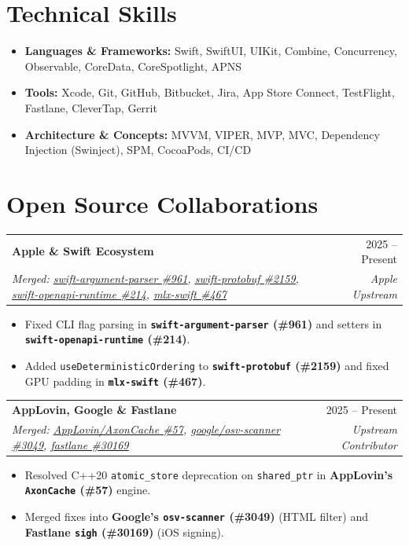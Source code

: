 \documentclass[a4paper,10pt]{article}
\makeatletter
\newcommand{\resumeSubheading}[4]{
  \vspace{4pt}
  \begin{tabular*}{\textwidth}{l@{\extracolsep{\fill}}r}
    \textbf{#1} & \small #2 \\
    \textit{\small #3} & \textit{\small #4} \\
  \end{tabular*}
  \vspace{-5pt}
}
\newcommand{\resumeItemListStart}{\begin{itemize}[leftmargin=0.16in, itemsep=1.8pt, topsep=2.5pt, parsep=0pt]\small}
\newcommand{\resumeItemListEnd}{\end{itemize}\vspace{-2pt}}
\makeatother
\begin{document}
\section{Technical Skills}
\resumeItemListStart
\item \textbf{Languages \& Frameworks:} Swift, SwiftUI, UIKit, Combine, Concurrency, Observable, CoreData, CoreSpotlight, APNS
\item \textbf{Tools:} Xcode, Git, GitHub, Bitbucket, Jira, App Store Connect, TestFlight, Fastlane, CleverTap, Gerrit
\item \textbf{Architecture \& Concepts:} MVVM, VIPER, MVP, MVC, Dependency Injection (Swinject), SPM, CocoaPods, CI/CD
\resumeItemListEnd

\section{Open Source Collaborations}

\resumeSubheading
{Apple \& Swift Ecosystem}{2025 -- Present}
{Merged: \href{https://github.com/apple/swift-argument-parser/pull/961}{\underline{swift-argument-parser \#961}}, \href{https://github.com/apple/swift-protobuf/pull/2159}{\underline{swift-protobuf \#2159}}, \href{https://github.com/apple/swift-openapi-runtime/pull/214}{\underline{swift-openapi-runtime \#214}}, \href{https://github.com/ml-explore/mlx-swift/pull/467}{\underline{mlx-swift \#467}}}{Apple Upstream}
\resumeItemListStart
\item Fixed CLI flag parsing in \textbf{\texttt{swift-argument-parser} (\#961)} and setters in \textbf{\texttt{swift-openapi-runtime} (\#214)}.
\item Added \texttt{useDeterministicOrdering} to \textbf{\texttt{swift-protobuf} (\#2159)} and fixed GPU padding in \textbf{\texttt{mlx-swift} (\#467)}.
\resumeItemListEnd

\resumeSubheading
{AppLovin, Google \& Fastlane}{2025 -- Present}
{Merged: \href{https://github.com/AppLovin/AxonCache/pull/57}{\underline{AppLovin/AxonCache \#57}}, \href{https://github.com/google/osv-scanner/pull/3049}{\underline{google/osv-scanner \#3049}}, \href{https://github.com/fastlane/fastlane/pull/30169}{\underline{fastlane \#30169}}}{Upstream Contributor}
\resumeItemListStart
\item Resolved C++20 \texttt{atomic\_store} deprecation on \texttt{shared\_ptr} in \textbf{AppLovin's \texttt{AxonCache} (\#57)} engine.
\item Merged fixes into \textbf{Google's \texttt{osv-scanner} (\#3049)} (HTML filter) and \textbf{Fastlane \texttt{sigh} (\#30169)} (iOS signing).
\resumeItemListEnd
\end{document}
